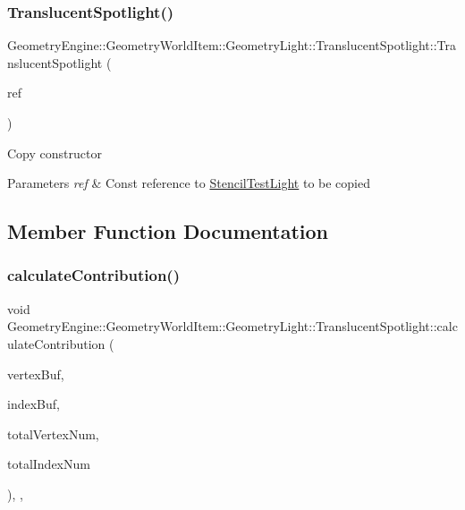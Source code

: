 \subsubsection{\texorpdfstring{TranslucentSpotlight()}{TranslucentSpotlight()}\hspace{0.1cm}{\footnotesize\ttfamily [2/2]}}
{\footnotesize\ttfamily Geometry\+Engine\+::\+Geometry\+World\+Item\+::\+Geometry\+Light\+::\+Translucent\+Spotlight\+::\+Translucent\+Spotlight (\begin{DoxyParamCaption}\item[{const \mbox{\hyperlink{class_geometry_engine_1_1_geometry_world_item_1_1_geometry_light_1_1_translucent_spotlight}{Translucent\+Spotlight}} \&}]{ref }\end{DoxyParamCaption})\hspace{0.3cm}{\ttfamily [inline]}}

Copy constructor 
\begin{DoxyParams}{Parameters}
{\em ref} & Const reference to \mbox{\hyperlink{class_geometry_engine_1_1_geometry_world_item_1_1_geometry_light_1_1_stencil_test_light}{Stencil\+Test\+Light}} to be copied \\
\hline
\end{DoxyParams}


\subsection{Member Function Documentation}
\mbox{\label{class_geometry_engine_1_1_geometry_world_item_1_1_geometry_light_1_1_translucent_spotlight_a19c2953098d4b1388b9693be79989199}} 
\subsubsection{\texorpdfstring{calculateContribution()}{calculateContribution()}}
{\footnotesize\ttfamily void Geometry\+Engine\+::\+Geometry\+World\+Item\+::\+Geometry\+Light\+::\+Translucent\+Spotlight\+::calculate\+Contribution (\begin{DoxyParamCaption}\item[{Q\+Open\+G\+L\+Buffer $\ast$}]{vertex\+Buf,  }\item[{Q\+Open\+G\+L\+Buffer $\ast$}]{index\+Buf,  }\item[{unsigned int}]{total\+Vertex\+Num,  }\item[{unsigned int}]{total\+Index\+Num }\end{DoxyParamCaption})\hspace{0.3cm}{\ttfamily [override]}, {\ttfamily [protected]}, {\ttfamily [virtual]}}


